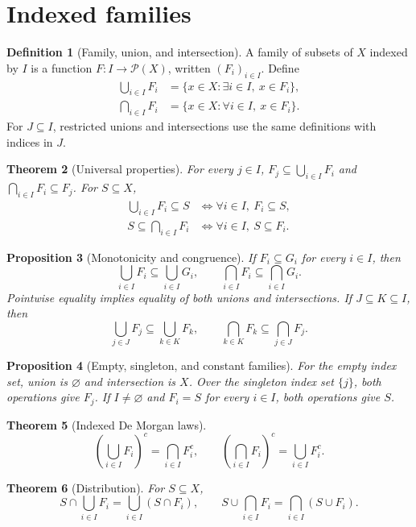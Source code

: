 \documentclass[11pt]{article}
\newtheorem{theorem}{Theorem}[section]
\newtheorem{proposition}[theorem]{Proposition}
\theoremstyle{definition}
\newtheorem{definition}[theorem]{Definition}
\newcommand{\Pow}{\mathcal P}
\begin{document}
\section{Indexed families}
\begin{definition}[Family, union, and intersection]
A family of subsets of $X$ indexed by $I$ is a function
$F:I\to\Pow(X)$, written $(F_i)_{i\in I}$. Define
\begin{align*}
\bigcup_{i\in I}F_i&=\{x\in X:\exists i\in I,\ x\in F_i\},\\
\bigcap_{i\in I}F_i&=\{x\in X:\forall i\in I,\ x\in F_i\}.
\end{align*}
For $J\subseteq I$, restricted unions and intersections use the same
definitions with indices in $J$.
\end{definition}
\begin{theorem}[Universal properties]
For every $j\in I$, $F_j\subseteq\bigcup_{i\in I}F_i$ and
$\bigcap_{i\in I}F_i\subseteq F_j$. For $S\subseteq X$,
\begin{align*}
\bigcup_{i\in I}F_i\subseteq S&\iff\forall i\in I,\ F_i\subseteq S,\\
S\subseteq\bigcap_{i\in I}F_i&\iff\forall i\in I,\ S\subseteq F_i.
\end{align*}
\end{theorem}
\begin{proposition}[Monotonicity and congruence]
If $F_i\subseteq G_i$ for every $i\in I$, then
\[
\bigcup_{i\in I}F_i\subseteq\bigcup_{i\in I}G_i,
\qquad \bigcap_{i\in I}F_i\subseteq\bigcap_{i\in I}G_i.
\]
Pointwise equality implies equality of both unions and intersections.
If $J\subseteq K\subseteq I$, then
\[
\bigcup_{j\in J}F_j\subseteq\bigcup_{k\in K}F_k,
\qquad \bigcap_{k\in K}F_k\subseteq\bigcap_{j\in J}F_j.
\]
\end{proposition}
\begin{proposition}[Empty, singleton, and constant families]
For the empty index set, union is $\varnothing$ and intersection is $X$.
Over the singleton index set $\{j\}$, both operations give $F_j$.
If $I\ne\varnothing$ and $F_i=S$ for every $i\in I$, both operations give $S$.
\end{proposition}
\begin{theorem}[Indexed De Morgan laws]
\[
\left(\bigcup_{i\in I}F_i\right)^c=\bigcap_{i\in I}F_i^c,
\qquad
\left(\bigcap_{i\in I}F_i\right)^c=\bigcup_{i\in I}F_i^c.
\]
\end{theorem}
\begin{theorem}[Distribution]
For $S\subseteq X$,
\[
S\cap\bigcup_{i\in I}F_i=\bigcup_{i\in I}(S\cap F_i),
\qquad
S\cup\bigcap_{i\in I}F_i=\bigcap_{i\in I}(S\cup F_i).
\]
\end{theorem}
\end{document}
